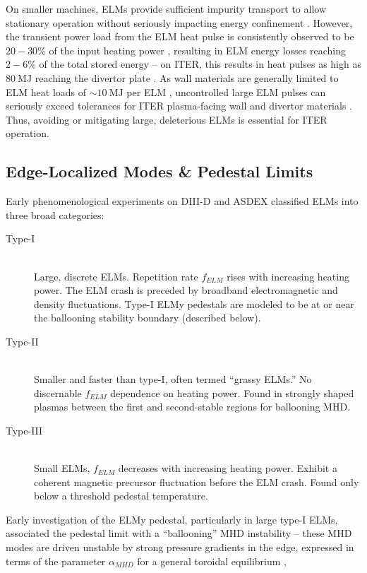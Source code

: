 On smaller machines, ELMs provide sufficient impurity transport to allow stationary operation without seriously impacting energy confinement \cite{Rice1999}.  However, the transient power load from the ELM heat pulse is consistently observed to be $20-30\%$ of the input heating power \cite{Suttrop2003}, resulting in ELM energy losses reaching $2-6\%$ of the total stored energy -- on ITER, this results in heat pulses as high as $\SI{80}{\mega\joule}$ reaching the divertor plate \cite{Leonard1999,Suttrop2000}.  As wall materials are generally limited to ELM heat loads of $\sim \SI{10}{\mega\joule}$ per ELM \cite{Federici2003}, uncontrolled large ELM pulses can seriously exceed tolerances for ITER plasma-facing wall and divertor materials \cite{Loarte2003,Federici2003}.  Thus, avoiding or mitigating large, deleterious ELMs is essential for ITER operation.

\subsection{Edge-Localized Modes \& Pedestal Limits}\label{subsec:hcr_elmy_fluct}

Early phenomenological experiments on DIII-D and ASDEX \cite{Zohm1996,Connor1998,Suttrop2000} classified ELMs into three broad categories:

\begin{description}
 \item[Type-I] \hfill \\
 Large, discrete ELMs.  Repetition rate $f_{ELM}$ rises with increasing heating power.  The ELM crash is preceded by broadband electromagnetic and density fluctuations.  Type-I ELMy pedestals are modeled to be at or near the ballooning stability boundary (described below).
 \item[Type-II] \hfill \\
 Smaller and faster than type-I, often termed ``grassy ELMs.''  No discernable $f_{ELM}$ dependence on heating power.  Found in strongly shaped plasmas between the first and second-stable regions for ballooning MHD.
 \item[Type-III] \hfill \\
 Small ELMs, $f_{ELM}$ decreases with increasing heating power.  Exhibit a coherent magnetic precursor fluctuation before the ELM crash.  Found only below a threshold pedestal temperature.
\end{description}

Early investigation of the ELMy pedestal, particularly in large type-I ELMs, associated the pedestal limit with a ``ballooning'' MHD instability -- these MHD modes are driven unstable by strong pressure gradients in the edge, expressed in terms of the parameter $\alpha_{MHD}$ for a general toroidal equilibrium \cite{Miller1998},

